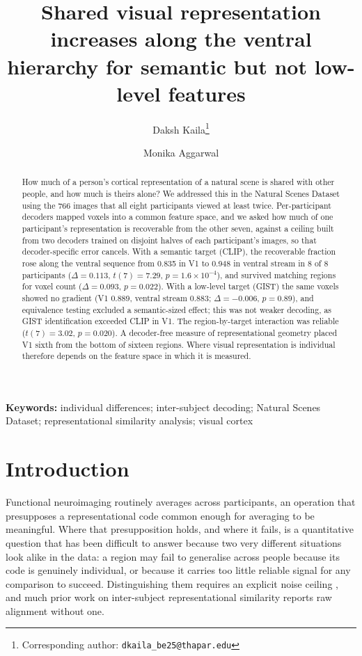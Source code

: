 \documentclass[11pt,a4paper]{article}
\title{\bfseries Shared visual representation increases along the ventral
hierarchy for semantic but not low-level features}
\author[1]{Daksh Kaila\thanks{Corresponding author:
\texttt{dkaila\_be25@thapar.edu}}}
\author[2]{Monika Aggarwal}
\affil[1]{Thapar Institute of Engineering and Technology, Patiala, Punjab, India}
\affil[2]{Indian Institute of Technology Delhi, New Delhi, India}
\date{}
\begin{document}
\maketitle

\begin{abstract}
\noindent
How much of a person's cortical representation of a natural scene is shared with
other people, and how much is theirs alone? We addressed this in the Natural
Scenes Dataset using the 766 images that all eight participants viewed at least
twice. Per-participant decoders mapped voxels into a common feature space, and we
asked how much of one participant's representation is recoverable from the other
seven, against a ceiling built from two decoders trained on disjoint halves of
each participant's images, so that decoder-specific error cancels. With a semantic target (CLIP), the recoverable fraction rose along the
ventral sequence from \num{0.835} in V1 to \num{0.948} in ventral stream in 8 of
8 participants ($\Delta = 0.113$, $t(7) = 7.29$, $p = 1.6\times10^{-4}$), and
survived matching regions for voxel count ($\Delta = 0.093$, $p = 0.022$). With a
low-level target (GIST) the same voxels showed no gradient (V1 \num{0.889},
ventral stream \num{0.883}; $\Delta = -0.006$, $p = 0.89$), and equivalence
testing excluded a semantic-sized effect; this was not weaker decoding, as GIST
identification exceeded CLIP in V1. The region-by-target interaction was reliable
($t(7) = 3.02$, $p = 0.020$). A decoder-free measure of representational
geometry placed V1 sixth from the bottom of sixteen regions. Where visual representation is individual therefore depends on the
feature space in which it is measured.
\end{abstract}

\vspace{0.5em}
\noindent\textbf{Keywords:} individual differences; inter-subject decoding;
Natural Scenes Dataset; representational similarity analysis; visual cortex

\clearpage

\section{Introduction}

Functional neuroimaging routinely averages across participants, an operation that
presupposes a representational code common enough for averaging to be meaningful.
Where that presupposition holds, and where it fails, is a quantitative question
that has been difficult to answer because two very different situations look
alike in the data: a region may fail to generalise across people because its code
is genuinely individual, or because it carries too little reliable signal for any
comparison to succeed. Distinguishing them requires an explicit noise ceiling
\citep{nili2014,walther2016,lagecastellanos2019}, and much prior work on
inter-subject representational similarity reports raw alignment without one.
\end{document}
